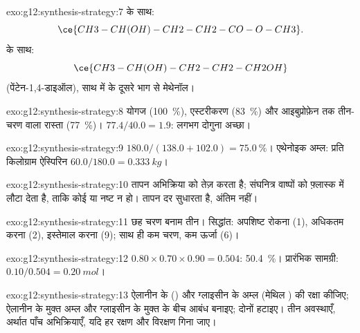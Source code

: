 \begin{solution}{exo:g12:synthesis-strategy:7}
 के साथ:
\[ \ce{CH3-CH(OH)-CH2-CH2-CO-O-CH3} . \]
 के साथ:
\[ \ce{CH3-CH(OH)-CH2-CH2-CH2OH} \]
(पेंटेन-1,4-डाइऑल), साथ में  के दूसरे भाग से मेथेनॉल।
\end{solution}

\begin{solution}{exo:g12:synthesis-strategy:8}
योगज (\qty{100}{\percent}), एस्टरीकरण
(\qty{83}{\percent}) और आइबुप्रोफ़ेन तक तीन-चरण वाला रास्ता
(\qty{77}{\percent})। $77.4/40.0 = 1.9$: लगभग दोगुना अच्छा।
\end{solution}

\begin{solution}{exo:g12:synthesis-strategy:9}
$180.0/(138.0 + 102.0) = \qty{75.0}{\percent}$। एथेनोइक अम्ल:
प्रति किलोग्राम ऐस्पिरिन $60.0/180.0 = \qty{0.333}{kg}$।
\end{solution}

\begin{solution}{exo:g12:synthesis-strategy:10}
तापन अभिक्रिया को तेज़ करता है; संघनित्र वाष्पों को फ़्लास्क में लौटा देता है,
ताकि कोई  या  नष्ट न हो। तापन दर सुधारता है,
अंतिम  नहीं।
\end{solution}

\begin{solution}{exo:g12:synthesis-strategy:11}
छह चरण बनाम तीन। सिद्धांत: अपशिष्ट रोकना (1),  अधिकतम
करना (2),  इस्तेमाल करना (9); साथ ही कम चरण, कम ऊर्जा (6)।
\end{solution}

\begin{solution}{exo:g12:synthesis-strategy:12}
$0.80 \times 0.70 \times 0.90 = 0.504$: \qty{50.4}{\percent}। प्रारंभिक
सामग्री: $0.10/0.504 = \qty{0.20}{mol}$।
\end{solution}

\begin{solution}{exo:g12:synthesis-strategy:13}
ऐलानीन के  () और ग्लाइसीन के अम्ल (मेथिल ) की रक्षा कीजिए;
ऐलानीन के मुक्त अम्ल और ग्लाइसीन के मुक्त  के बीच  आबंध
बनाइए; दोनों  हटाइए। तीन अवस्थाएँ, अर्थात पाँच
अभिक्रियाएँ, यदि हर रक्षण और विरक्षण गिना जाए।
\end{solution}

